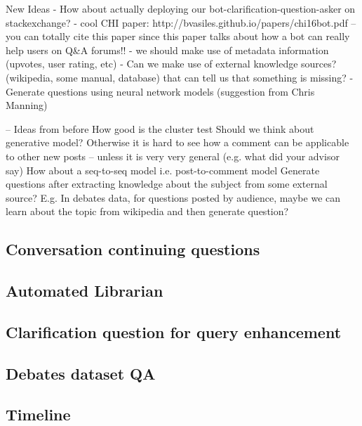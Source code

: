 \documentclass[11pt]{article}
\begin{document}
New Ideas
- How about actually deploying our bot-clarification-question-asker on stackexchange? - cool CHI paper: http://bvasiles.github.io/papers/chi16bot.pdf -- you can totally cite this paper since this paper talks about how a bot can really help users on Q&A forums!!
- we should make use of metadata information (upvotes, user rating, etc)
- Can we make use of external knowledge sources? (wikipedia, some manual, database) that can tell us that something is missing?
- Generate questions using neural network models (suggestion from Chris Manning)

-- Ideas from before
How good is the cluster test
Should we think about generative model? Otherwise it is hard to see how a comment can be applicable to other new posts -- unless it is very very general (e.g. what did your advisor say) 
How about a seq-to-seq model i.e. post-to-comment model
Generate questions after extracting knowledge about the subject from some external source? E.g. In debates data, for questions posted by audience, maybe we can learn about the topic from wikipedia and then generate question?


\subsection{Conversation continuing questions}

\subsection{Automated Librarian}

\subsection{Clarification question for query enhancement}

\subsection{Debates dataset QA}

\fi

\subsection{Timeline}

\section{}



\end{document}
